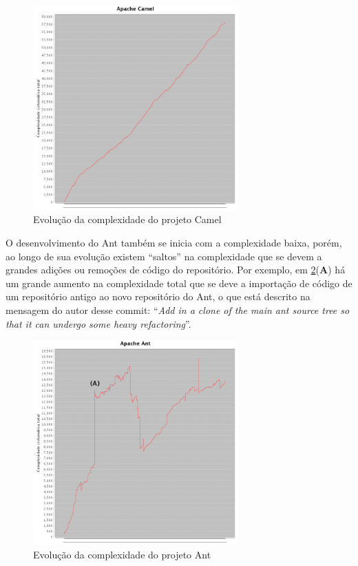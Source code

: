 \documentclass[a4paper, 12pt, twoside]{book}
\begin{document}
        \begin{figure}[ht]
            \centering
            \includegraphics[width=0.7\textwidth]{img/graficos/camel.png}
            \caption{Evolução da complexidade do projeto Camel}
            \label{fig:cc-camel}
        \end{figure}

        O desenvolvimento do Ant também se inicia com a complexidade baixa, porém, ao longo de sua evolução existem ``saltos'' na complexidade que se devem a grandes adições ou remoções de código do repositório. Por exemplo, em \ref{fig:cc-ant}(\textbf{A}) há um grande aumento na complexidade total que se deve a importação de código de um repositório antigo ao novo repositório do Ant, o que está descrito na mensagem  do autor desse commit: ``\textit{Add in a clone of the main ant source tree so that it can undergo some heavy refactoring}''.

        \begin{figure}[ht]
            \centering
            \includegraphics[width=0.7\textwidth]{img/graficos/ant.png}
            \caption{Evolução da complexidade do projeto Ant}
            \label{fig:cc-ant}
        \end{figure}
\end{document}
